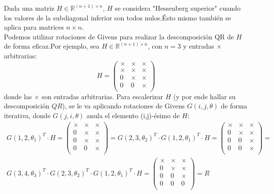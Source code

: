 \documentclass{endm}
\begin{document}
Dada una matriz $H \in \mathbb{R}^{(n+1) \times n}$, $H$ se considera "Hessenberg superior" cuando los valores de la subdiagonal inferior son todos nulos.\'Esto mismo tambi\'en se aplica para matrices $n\times n$. \\
Podemos utilizar rotaciones de Givens para realizar la descomposici\'on QR de $H$ de forma eficaz.Por ejemplo, sea $H \in \mathbb{R}^{(n+1) \times n}$, con $n = 3$ y entradas $\times$ arbitrarias: 
\begin{equation*}
    H = \begin{pmatrix}
            \times & \times & \times\\
            \times & \times & \times\\
            0      & \times & \times\\
            0      & 0      & \times\\
        \end{pmatrix}
\end{equation*} donde las $\times$ son entradas arbitrarias.
Para escalerizar $H$ (y por ende hallar su descomposici\'on $QR$), se le va aplicando rotaciones de Givens $G(i,j,\theta)$ de forma iterativa, donde $G(j,i,\theta)$ anula el elemento (i,j)-\'esimo de $H$:\\

\begin{multline*}
    G(1,2,\theta_{1})^{T}\cdot H = \begin{pmatrix}
            \times & \times & \times\\
            0      & \times & \times\\
            0      & \times & \times\\
            0      & 0      & \times\\
        \end{pmatrix}
    =     G(2,3,\theta_{2})^{T}\cdot G(1,2,\theta_{1})^{T}\cdot H = 
    \begin{pmatrix}
            \times & \times & \times\\
            0      & \times & \times\\
            0      & 0      & \times\\
            0      & 0      & \times\\
        \end{pmatrix} = \\
    G(3,4,\theta_{3})^{T}\cdot G(2,3,\theta_{2})^{T}\cdot G(1,2,\theta_{1})^{T}\cdot H = \begin{pmatrix}
            \times & \times & \times\\
            0      & \times & \times\\
            0      & 0      & \times\\
            0      & 0      & 0     \\
        \end{pmatrix} = R
\end{multline*}
\end{document}
